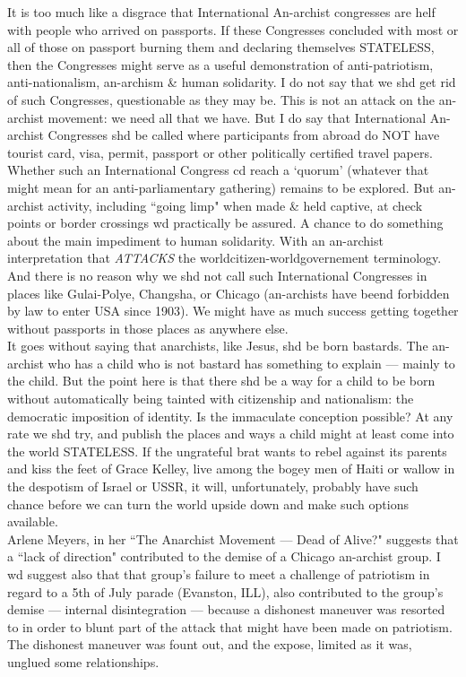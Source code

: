 It is too much like a disgrace that International An-archist congresses are helf with people who arrived on passports. If these Congresses concluded with most or all of those on passport burning them and declaring themselves STATELESS, then the Congresses might serve as a useful demonstration of anti-patriotism, anti-nationalism, an-archism \& human solidarity. I do not say that we shd get rid of such Congresses, questionable as they may be. This is not an attack on the an-archist movement: we need all that we have. But I do say that International An-archist Congresses shd be called where participants from abroad do NOT have tourist card, visa, permit, passport or other politically certified travel papers. Whether such an International Congress cd reach a `quorum' (whatever that might mean for an anti-parliamentary gathering) remains to be explored. But an-archist activity, including ``going limp" when made \& held captive, at check points or border crossings wd practically be assured. A chance to do something about the main impediment to human solidarity. With an an-archist interpretation that \emph{ATTACKS} the worldcitizen-worldgovernement terminology.\\
And there is no reason why we shd not call such International Congresses in places like Gulai-Polye, Changsha, or Chicago (an-archists have beend forbidden by law to enter USA since 1903). We might have as much success getting together without passports in those places as anywhere else.\\
It goes without saying that anarchists, like Jesus, shd be born bastards. The an-archist who has a child who is not bastard has something to explain --- mainly to the child. But the point here is that there shd be a way for a child to be born without automatically  being tainted with citizenship and nationalism: the democratic imposition of identity. Is the immaculate conception possible? At any rate we shd try, and publish the places and ways a child might at least come into the world STATELESS. If the ungrateful brat wants to rebel against its parents and kiss the feet of Grace Kelley, live among the bogey men of Haiti or wallow in the despotism of Israel or USSR, it will, unfortunately, probably have such chance before we can turn the world upside down and make such options available.\\
Arlene Meyers, in her ``The Anarchist Movement --- Dead of Alive?" suggests that a ``lack of direction" contributed to the demise of a Chicago an-archist group. I wd suggest also that that group's failure to meet a challenge of patriotism in regard to a 5th of July parade (Evanston, ILL), also contributed to the group's demise --- internal disintegration --- because a dishonest maneuver was resorted to in order to blunt part of the attack that might have been made on patriotism. The dishonest maneuver was fount out, and the expose, limited as it was, unglued some relationships.\\
